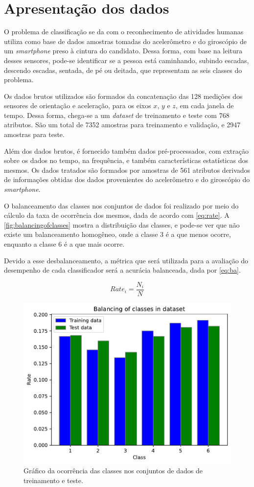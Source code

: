 
\section{Apresentação dos dados}

O problema de classificação se da com o reconhecimento de atividades humanas utiliza como base de dados amostras tomadas do acelerômetro e do giroscópio de um \textit{smartphone} preso à cintura do candidato. Dessa forma, com base na leitura desses sensores, pode-se identificar se a pessoa está caminhando, subindo escadas, descendo escadas, sentada, de pé ou deitada, que representam as seis classes do problema.

Os dados brutos utilizados são formados da concatenação das 128 medições dos sensores de orientação e aceleração, para os eixos $x$, $y$ e $z$, em cada janela de tempo. Dessa forma, chega-se a um \textit{dataset} de treinamento e teste com 768 atributos. São um total de 7352 amostras para treinamento e validação, e 2947 amostras para teste.

Além dos dados brutos, é fornecido também dados pré-processados, com extração sobre os dados no tempo, na frequência, e também características estatísticas dos mesmos. Os dados tratados são formados por amostras de 561 atributos derivados de informações obtidas dos dados provenientes do acelerômetro e do giroscópio do \textit{smartphone}. 

O balanceamento das classes nos conjuntos de dados foi realizado por meio do cálculo da taxa de ocorrência dos mesmos, dada de acordo com \eqref{eq:rate}. A \autoref{fig:balancingofclasses} mostra a distribuição das classes, e pode-se ver que não existe um balanceamento homogêneo, onde a classe 3 é a que menos ocorre, enquanto a classe  6 é a que mais ocorre.

Devido a esse desbalanceamento, a métrica que será utilizada para a avaliação do desempenho de cada classificador será a acurácia balanceada, dada por \eqref{eq:ba}.

\begin{equation}\label{eq:rate}
	Rate_i = \frac{N_i}{N}
\end{equation}

\begin{figure}[H]
	\centering
	\includegraphics[width=0.55\linewidth]{../../plot/Balancing_of_classes}
	\caption{Gráfico da ocorrência das classes nos conjuntos de dados de treinamento e teste.}
	\label{fig:balancingofclasses}
\end{figure}

